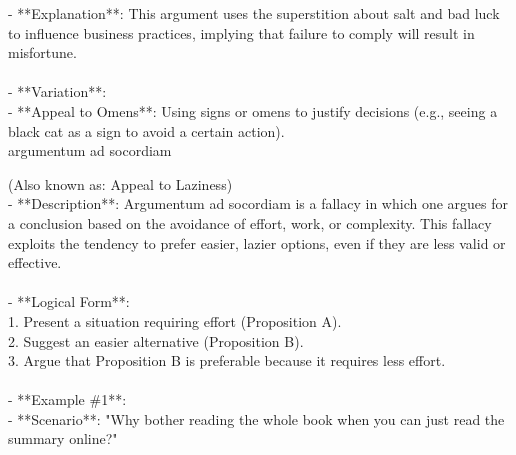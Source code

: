 \documentclass[a4paper,12pt,single,pdftex]{scrbook}
\begin{document}
    
        - **Explanation**: This argument uses the superstition about salt and bad luck to influence business practices, implying that failure to comply will result in misfortune.
    \\

    
      
    \\

    
      - **Variation**:
    \\

    
        - **Appeal to Omens**: Using signs or omens to justify decisions (e.g., seeing a black cat as a sign to avoid a certain action).
    \\

  

argumentum ad socordiam
    
      (Also known as: Appeal to Laziness)
    \\

  
    
      - **Description**: Argumentum ad socordiam is a fallacy in which one argues for a conclusion based on the avoidance of effort, work, or complexity. This fallacy exploits the tendency to prefer easier, lazier options, even if they are less valid or effective.
    \\

    
      
    \\

    
      - **Logical Form**:
    \\

    
        1. Present a situation requiring effort (Proposition A).
    \\

    
        2. Suggest an easier alternative (Proposition B).
    \\

    
        3. Argue that Proposition B is preferable because it requires less effort.
    \\

    
      
    \\

    
      - **Example \#1**:
    \\

    
        - **Scenario**: "Why bother reading the whole book when you can just read the summary online?"
    \\
\end{document}
